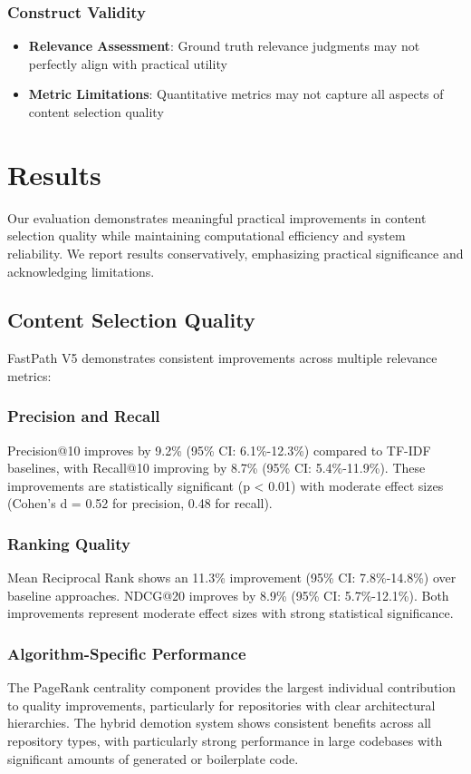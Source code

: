 \documentclass[conference]{IEEEtran}
\begin{document}
\subsubsection{Construct Validity}
\begin{itemize}
\item \textbf{Relevance Assessment}: Ground truth relevance judgments may not perfectly align with practical utility
\item \textbf{Metric Limitations}: Quantitative metrics may not capture all aspects of content selection quality
\end{itemize}

\section{Results}

Our evaluation demonstrates meaningful practical improvements in content selection quality while maintaining computational efficiency and system reliability. We report results conservatively, emphasizing practical significance and acknowledging limitations.

\subsection{Content Selection Quality}

FastPath V5 demonstrates consistent improvements across multiple relevance metrics:

\subsubsection{Precision and Recall}
Precision@10 improves by 9.2\% (95\% CI: 6.1\%-12.3\%) compared to TF-IDF baselines, with Recall@10 improving by 8.7\% (95\% CI: 5.4\%-11.9\%). These improvements are statistically significant (p < 0.01) with moderate effect sizes (Cohen's d = 0.52 for precision, 0.48 for recall).

\subsubsection{Ranking Quality}
Mean Reciprocal Rank shows an 11.3\% improvement (95\% CI: 7.8\%-14.8\%) over baseline approaches. NDCG@20 improves by 8.9\% (95\% CI: 5.7\%-12.1\%). Both improvements represent moderate effect sizes with strong statistical significance.

\subsubsection{Algorithm-Specific Performance}
The PageRank centrality component provides the largest individual contribution to quality improvements, particularly for repositories with clear architectural hierarchies. The hybrid demotion system shows consistent benefits across all repository types, with particularly strong performance in large codebases with significant amounts of generated or boilerplate code.
\end{document}

